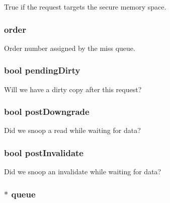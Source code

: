 \label{classMSHR_a62bc84f4251f16cf0cfa0f8d96e00c37}
True if the request targets the secure memory space. \hypertarget{classMSHR_a268baba59d9078c070be7059fd90d9bc}{
\subsubsection[{order}]{ {\bf order}}}
\label{classMSHR_a268baba59d9078c070be7059fd90d9bc}
Order number assigned by the miss queue. \hypertarget{classMSHR_a2c6e696fb220ec9db6d72d614998c800}{
\subsubsection[{pendingDirty}]{\setlength{\rightskip}{0pt plus 5cm}bool {\bf pendingDirty}}}
\label{classMSHR_a2c6e696fb220ec9db6d72d614998c800}
Will we have a dirty copy after this request? \hypertarget{classMSHR_a361fccb7e46b8119bda165f80f2753ac}{
\subsubsection[{postDowngrade}]{\setlength{\rightskip}{0pt plus 5cm}bool {\bf postDowngrade}}}
\label{classMSHR_a361fccb7e46b8119bda165f80f2753ac}
Did we snoop a read while waiting for data? \hypertarget{classMSHR_af4c42f3027a6f426f32521a251fd724d}{
\subsubsection[{postInvalidate}]{\setlength{\rightskip}{0pt plus 5cm}bool {\bf postInvalidate}}}
\label{classMSHR_af4c42f3027a6f426f32521a251fd724d}
Did we snoop an invalidate while waiting for data? \hypertarget{classMSHR_a524ec1b0c7b11e23904171e42211679e}{
\subsubsection[{queue}]{$\ast$ {\bf queue}}}
